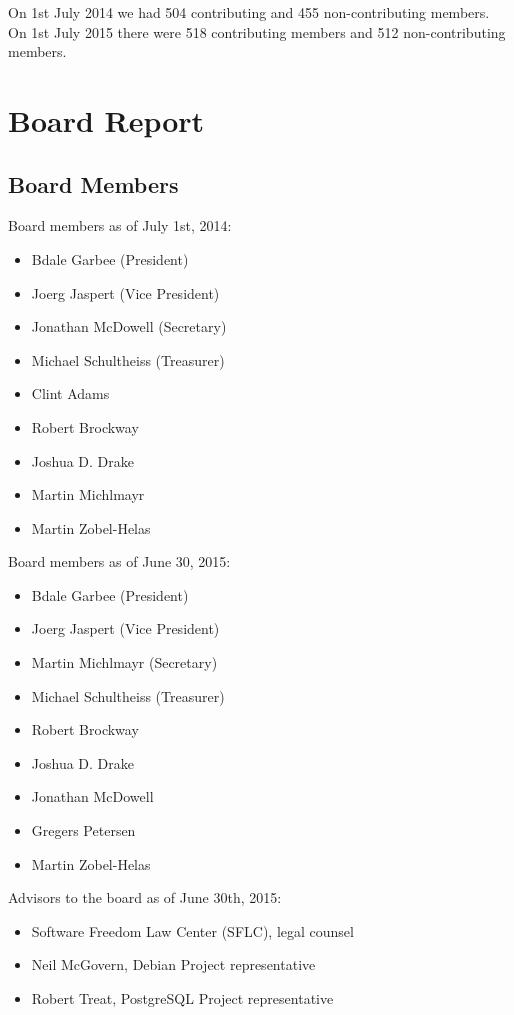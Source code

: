 \documentclass[letterpaper]{report}
\begin{document}
On 1st July 2014 we had 504 contributing and 455 non-contributing members.
On 1st July 2015 there were 518 contributing members and 512 non-contributing
members.


\chapter{Board Report}
\section{Board Members}

Board members as of July 1st, 2014:

\begin{itemize}
\item Bdale Garbee (President)
\item Joerg Jaspert (Vice President)
\item Jonathan McDowell (Secretary)
\item Michael Schultheiss (Treasurer)
\item Clint Adams
\item Robert Brockway
\item Joshua D. Drake
\item Martin Michlmayr
\item Martin Zobel-Helas
\end{itemize}

Board members as of June 30, 2015:

\begin{itemize}
\item Bdale Garbee (President)
\item Joerg Jaspert (Vice President)
\item Martin Michlmayr (Secretary)
\item Michael Schultheiss (Treasurer)
\item Robert Brockway
\item Joshua D. Drake
\item Jonathan McDowell
\item Gregers Petersen
\item Martin Zobel-Helas
\end{itemize}

Advisors to the board as of June 30th, 2015:

\begin{itemize}
\item Software Freedom Law Center (SFLC), legal counsel
\item Neil McGovern, Debian Project representative
\item Robert Treat, PostgreSQL Project representative
\end{itemize}
\end{document}
